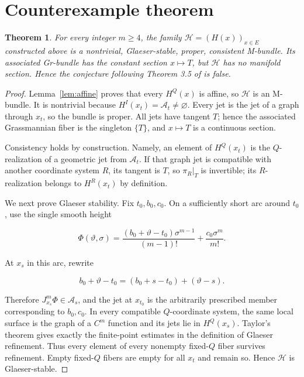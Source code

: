 \documentclass[11pt]{article}
\newtheorem{theorem}{Theorem}
\newcommand{\cH}{\mathcal H}
\newcommand{\cA}{\mathcal A}
\begin{document}
\section{Counterexample theorem}

\begin{theorem}\label{thm:counterexample}
For every integer \(m\ge4\), the family
\(\cH=(H(x))_{x\in E}\) constructed above is a nontrivial,
Glaeser-stable, proper, consistent M-bundle. Its associated Gr-bundle has
the constant section \(x\mapsto T\), but \(\cH\) has no manifold section.
Hence the conjecture following Theorem 3.5 of \cite{source} is false.
\end{theorem}

\begin{proof}
Lemma~\ref{lem:affine} proves that every \(H^Q(x)\) is affine, so \(\cH\)
is an M-bundle. It is nontrivial because \(H^I(x_t)=\cA_t\ne\varnothing\).
Every jet is the jet of a graph through \(x_t\), so the bundle is proper.
All jets have tangent \(T\); hence the associated Grassmannian fiber is the
singleton \(\{T\}\), and \(x\mapsto T\) is a continuous section.

Consistency holds by construction. Namely, an element of \(H^Q(x_t)\) is
the \(Q\)-realization of a geometric jet from \(\cA_t\). If that graph jet
is compatible with another coordinate system \(R\), its tangent is \(T\),
so \(\pi_R|_T\) is invertible; its \(R\)-realization belongs to
\(H^R(x_t)\) by definition.

We next prove Glaeser stability. Fix \(t_0,b_0,c_0\). On a sufficiently
short arc around \(t_0\), use the single smooth height

\[
 \Phi(\vartheta,\sigma)=
 \frac{(b_0+\vartheta-t_0)\sigma^{m-1}}{(m-1)!}
 +\frac{c_0\sigma^m}{m!}.
\]

At \(x_s\) in this arc, rewrite

\[
 b_0+\vartheta-t_0=(b_0+s-t_0)+(\vartheta-s).
\]

Therefore \(J^m_{x_s}\Phi\in\cA_s\), and the jet at \(x_{t_0}\) is the
arbitrarily prescribed member corresponding to \(b_0,c_0\). In every
compatible \(Q\)-coordinate system, the same local surface is the graph of
a \(C^m\) function and its jets lie in \(H^Q(x_s)\). Taylor's theorem gives
exactly the finite-point estimates in the definition of Glaeser refinement.
Thus every element of every nonempty fixed-\(Q\) fiber survives refinement.
Empty fixed-\(Q\) fibers are empty for all \(x_t\) and remain so. Hence
\(\cH\) is Glaeser-stable.


\end{proof}
\end{document}
